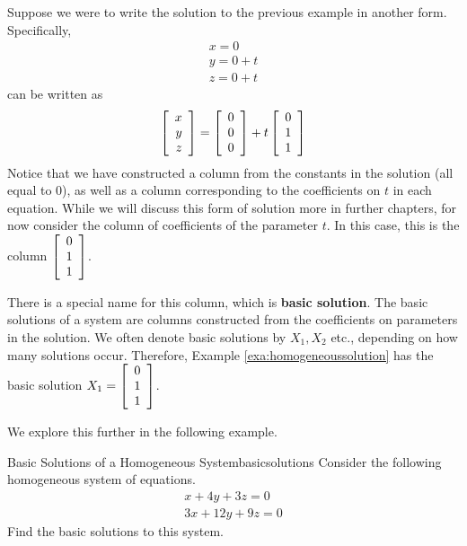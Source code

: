 Suppose we were to write the solution to the previous example in another form.
Specifically,
\begin{equation*}
\begin{array}{c}
x = 0 \\
y = 0 + t \\
z = 0 + t
\end{array}
\end{equation*}
can be written as 
\begin{equation*}
\left[
\begin{array}{r}
x\\
y\\
z
\end{array}
\right]
 =
\left[
\begin{array}{r}
0\\
0\\
0
\end{array}
\right]
 +
t
\left[
\begin{array}{r}
0\\
1\\
1
\end{array}
\right]
\end{equation*}
Notice that we have constructed a column from the constants in the solution (all equal to $0$),
 as well as a column corresponding to the 
coefficients on $t$ in each equation. While we will discuss this form of solution more in further chapters, 
for now consider the column of coefficients 
of the parameter $t$. In this case, this is the column
$\left[
\begin{array}{r}
0\\
1\\
1
\end{array}
\right]$. 

There is a special name for this column, which is \textbf{basic solution}. The basic solutions of a system 
are columns constructed from the coefficients on parameters in the solution. We often denote basic solutions 
by $X_1, X_2$ etc., depending on how many solutions occur. Therefore, Example \ref{exa:homogeneoussolution}
has the basic solution $X_1 = \left[
\begin{array}{r}
0\\
1\\
1
\end{array}
\right]$. 

We explore this further in the following example. 

\begin{example}{Basic Solutions of a Homogeneous System}{basicsolutions}
Consider the following homogeneous system of equations. 
\begin{equation*}
\begin{array}{c}
x + 4y + 3z = 0 \\
3x + 12y + 9z = 0
\end{array}
\end{equation*}
Find the basic solutions to this system.
\end{example}

